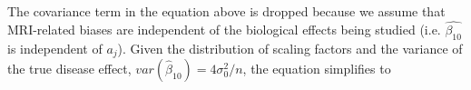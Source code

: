 The covariance term in the equation above is dropped because we assume that MRI-related biases are independent of the biological effects being studied (i.e. $\hat{\beta_{10}}$ is independent of $a_j$). Given the distribution of scaling factors and the variance of the true disease effect, $var(\hat{\beta}_{10}) = 4\sigma_0^2/n$, the equation simplifies to